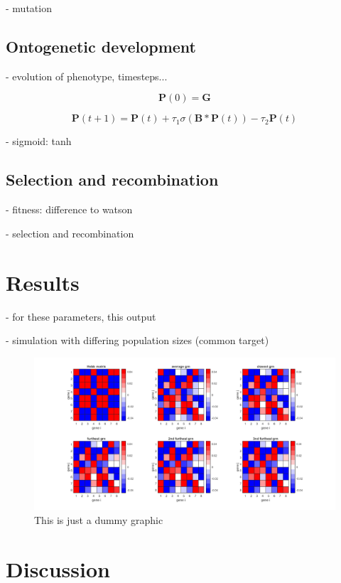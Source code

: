 \documentclass{article}
\begin{document}
- mutation

\subsection{Ontogenetic development}
- evolution of phenotype, timesteps...

\begin{equation}
	\bm{P}(0) = \bm{G}
\end{equation}

\begin{equation}
	\bm{P}(t+1) = \bm{P}(t) + \tau_1\sigma(\bm{B}*\bm{P}(t))-\tau_2\bm{P}(t)
\end{equation}

- sigmoid: tanh

\subsection{Selection and recombination}
- fitness: difference to watson

- selection and recombination



\section{Results}

- for these parameters, this output

- simulation with differing population sizes (common target)

\begin{figure}[H]
	\includegraphics[width=\linewidth]{./img/dummy.jpg}
	\caption{This is just a dummy graphic}
	\label{fig:dummy}
\end{figure}


\section{Discussion}
\end{document}
